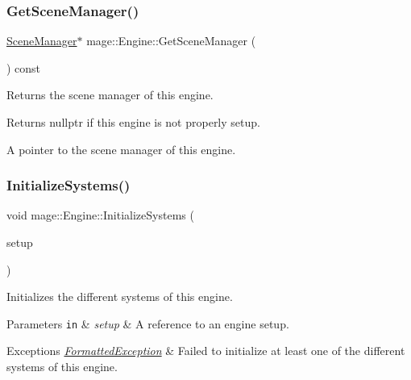 \subsubsection{\texorpdfstring{Get\+Scene\+Manager()}{GetSceneManager()}}
{\footnotesize\ttfamily \hyperlink{classmage_1_1_scene_manager}{Scene\+Manager}$\ast$ mage\+::\+Engine\+::\+Get\+Scene\+Manager (\begin{DoxyParamCaption}{ }\end{DoxyParamCaption}) const\hspace{0.3cm}{\ttfamily [noexcept]}}

Returns the scene manager of this engine.

\begin{DoxyReturn}{Returns}
{\ttfamily nullptr} if this engine is not properly setup. 

A pointer to the scene manager of this engine. 
\end{DoxyReturn}
\hypertarget{classmage_1_1_engine_a29a47448fb182b110d46d287a72b8b4e}{}\label{classmage_1_1_engine_a29a47448fb182b110d46d287a72b8b4e} 
\subsubsection{\texorpdfstring{Initialize\+Systems()}{InitializeSystems()}}
{\footnotesize\ttfamily void mage\+::\+Engine\+::\+Initialize\+Systems (\begin{DoxyParamCaption}\item[{const \hyperlink{structmage_1_1_engine_setup}{Engine\+Setup} \&}]{setup }\end{DoxyParamCaption})\hspace{0.3cm}{\ttfamily [private]}}

Initializes the different systems of this engine.


\begin{DoxyParams}[1]{Parameters}
\mbox{\tt in}  & {\em setup} & A reference to an engine setup. \\
\hline
\end{DoxyParams}

\begin{DoxyExceptions}{Exceptions}
{\em \hyperlink{classmage_1_1_formatted_exception}{Formatted\+Exception}} & Failed to initialize at least one of the different systems of this engine. \\
\hline
\end{DoxyExceptions}
\hypertarget{classmage_1_1_engine_afd52a8088d6d37605cb352028098c508}{}\label{classmage_1_1_engine_afd52a8088d6d37605cb352028098c508} 
